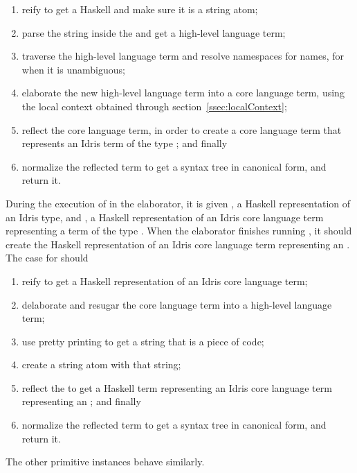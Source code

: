 \begin{enumerate}[leftmargin=10pt]
  \item reify  to get a Haskell \sexp{} and make sure it is a string atom;
  \item parse the string inside the \sexp{} and get a high-level language term;
  \item traverse the high-level language term and resolve namespaces for names, for when it is unambiguous;
  \item elaborate the new high-level language term into a core language term, using the local context obtained through section~\ref{ssec:localContext};
  \item reflect the core language term, in order to create a core language term that represents an Idris term of the type \TT{}; and finally
  \item normalize the reflected term to get a syntax tree in canonical form, and return it.
\end{enumerate}

During the execution of  in the elaborator, it is given
, a Haskell representation of an Idris type, and ,
a Haskell representation of an Idris core language term representing
a term of the type .
When the elaborator finishes running , it should create
the Haskell representation of an Idris core language term representing an
\sexp{}. The \TT{} case for  should

\begin{enumerate}[leftmargin=10pt]
  \item reify  to get a Haskell representation of an Idris core language term;
  \item delaborate and resugar the core language term into a high-level language term;
  \item use pretty printing to get a string that is a piece of code;
  \item create a string atom \sexp{} with that string;
  \item reflect the \sexp{} to get a Haskell term representing an Idris core language term representing an \sexp{}; and finally
  \item normalize the reflected term to get a syntax tree in canonical form, and return it.
\end{enumerate}

\noindent
The other primitive instances behave similarly.

